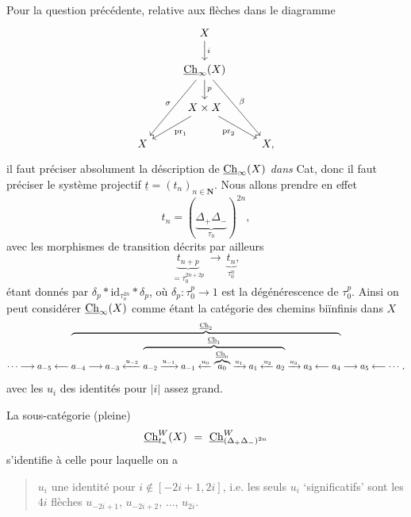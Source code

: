 Pour la question précédente, relative aux flèches dans le diagramme
\[
\begin{tikzcd}
& X \arrow[d, "i"] & \\
& \Ch_{\infty}(X) \arrow[d, "p"] \arrow[ddl, "\sigma"'] \arrow[ddr, "\beta"] & \\
& X \times X \arrow[dl, "\mathrm{pr}_1"] \arrow[dr, "\mathrm{pr}_2"'] & \\
X & & X,
\end{tikzcd}
\]
il faut préciser absolument la déscription de $\underline{\mathrm{Ch}}_{\infty}(X)$ \textit{dans} Cat, donc il faut préciser le système projectif $\underline{t} = (t_n)_{n \in \mathbf{N}}$. Nous allons prendre en effet %
\[
t_n = (\underbrace{\Delta_+ \Delta_-}_{\tau_0})^{2n},
\]
avec les morphismes de transition décrits par ailleurs
\[
\underbrace{t_{n+p}}_{=\tau_0^{2n+2p}} \ \longrightarrow \ \underbrace{t_n}_{\tau_0^{n}}, %
\]
étant donnés par $\delta_p * \mathrm{id}_{\tau_o^{2n}} * \delta_p$, où $\delta_p : \tau_0^p \longrightarrow 1$ est la dégénérescence de $\tau_0^p$. Ainsi on peut considérer $\underline{\mathrm{Ch}}_{\infty}(X)$ comme étant la catégorie des chemins biïnfinis dans $X$ %
\[
\cdots \longrightarrow a_{-5} \longleftarrow \overbrace{a_{-4} \longrightarrow a_{-3} \xleftarrow{u_{-2}} \overbrace{a_{-2} \xrightarrow{u_{-1}} a_{-1} \xleftarrow{u_0} \overbrace{a_0}^{\underline{\mathrm{Ch}}_0} \xrightarrow{u_1} a_1 \xleftarrow{u_2} a_2}^{\underline{\mathrm{Ch}}_1} \xrightarrow{u_3} a_3 \longleftarrow a_4}^{\underline{\mathrm{Ch}}_2} \longrightarrow a_5 \longleftarrow \cdots,
\]
avec les $u_i$ des identités pour $|i|$ assez grand.

La sous-catégorie (pleine)
\[
\Ch^{W}_{t_n}(X) \ = \ \Ch^{W}_{(\Delta_+\Delta_-)^{2n}}
\]
s'identifie à celle pour laquelle on a
\begin{quote}
$u_i$ une identité pour $i \notin [-2i+1, 2i]$, i.e. les seuls $u_i$ `significatifs' sont les $4i$ flèches $u_{-2i+1}$, $u_{-2i+2}$, $\ldots$, $u_{2i}$. %
\end{quote}

